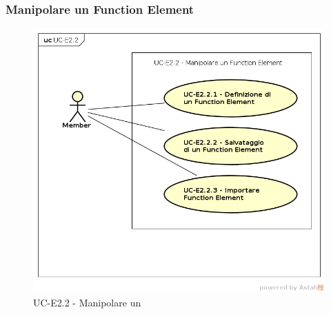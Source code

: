     
\subsubsection{Manipolare un Function Element}
    \begin{figure}[H]
      \begin{center}
        \includegraphics[width=12cm]{res/img/UCEditor/UC-E2.2.png}
      \caption{UC-E2.2 - Manipolare un }
      \end{center} 
    \end{figure}

